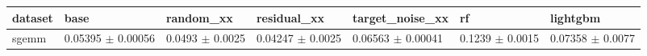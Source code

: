 \begin{tabular}{lllllll}
\toprule
dataset & base & random\_xx & residual\_xx & target\_noise\_xx & rf & lightgbm \\
\midrule
sgemm & 0.05395 $\pm$ 0.00056 & 0.0493 $\pm$ 0.0025 & 0.04247 $\pm$ 0.0025 & 0.06563 $\pm$ 0.00041 & 0.1239 $\pm$ 0.0015 & 0.07358 $\pm$ 0.0077 \\
\bottomrule
\end{tabular}

